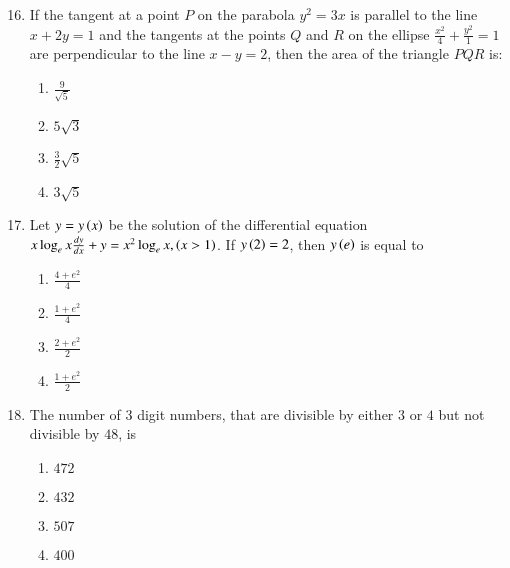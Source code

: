 \documentclass[journal]{IEEEtran}
\begin{document}
\begin{enumerate}
\setcounter{enumi}{15}
 
    \item If the tangent at a point $P$ on the parabola $y^2 = 3x$ is parallel to the line $x+2y=1$ and the tangents at the points $Q$ and $R$ on the ellipse $\frac{x^2}{4}+\frac{y^2}{1}=1$ are perpendicular to the line $x-y=2$, then the area of the triangle $PQR$ is:

        \begin{multicols}{4}
            \begin{enumerate}
                \item $\frac{9}{\sqrt{5}}$
                \item $5\sqrt{3}$
                \item $\frac{3}{2}\sqrt{5}$
                \item $3\sqrt{5}$
            \end{enumerate}
        \end{multicols}

    \item Let $y=y\left(x\right)$ be the solution of the differential equation $x\log_ex\frac{dy}{dx}+y=x^2\log_ex,\left(x>1\right)$. If $y\left(2\right)=2$, then $y\left(e\right)$ is equal to

		\begin{multicols}{4}
			\begin{enumerate}
				\item $\frac{4+e^2}{4}$
				\item $\frac{1+e^2}{4}$
				\item $\frac{2+e^2}{2}$
				\item $\frac{1+e^2}{2}$
			\end{enumerate}
		\end{multicols}

    \item The number of $3$ digit numbers, that are divisible by either $3$ or $4$ but not divisible by $48$, is

        \begin{multicols}{4}
            \begin{enumerate}
                \item $472$
                \item $432$
                \item $507$
                \item $400$
            \end{enumerate}
        \end{multicols}


\end{enumerate}
\end{document}
